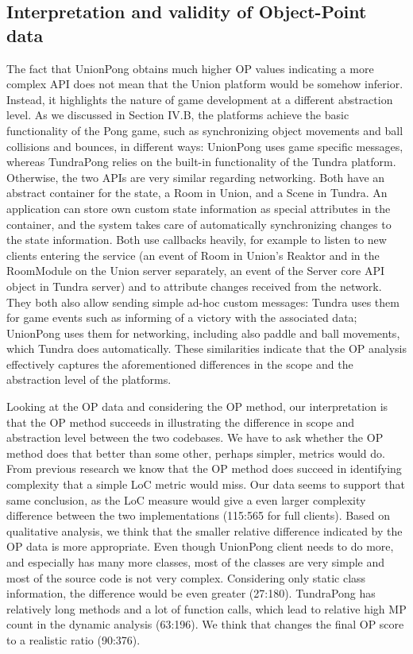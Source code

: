 \documentclass[conference]{IEEEtran}
\begin{document}
\subsection{Interpretation and validity of Object-Point data%
  \label{interpretation-and-validity-of-object-point-data}%
}

The fact that UnionPong obtains much higher OP values indicating a
more complex API does not mean that the Union platform would be
somehow inferior. Instead, it highlights the nature of game
development at a different abstraction level. As we discussed in
Section IV.B, the platforms achieve the basic functionality of the
Pong game, such as synchronizing object movements and ball collisions
and bounces, in different ways: UnionPong uses game specific messages,
whereas TundraPong relies on the built-in functionality of the Tundra
platform. Otherwise, the two APIs are very similar regarding
networking. Both have an abstract container for the state, a Room in
Union, and a Scene in Tundra. An application can store own custom
state information as special attributes in the container, and the
system takes care of automatically synchronizing changes to the state
information. Both use callbacks heavily, for example to listen to new
clients entering the service (an event of Room in Union's Reaktor and
in the RoomModule on the Union server separately, an event of the
Server core API object in Tundra server) and to attribute changes
received from the network. They both also allow sending simple ad-hoc
custom messages: Tundra uses them for game events such as informing of
a victory with the associated data; UnionPong uses them for
networking, including also paddle and ball movements, which Tundra
does automatically. These similarities indicate that the OP analysis
effectively captures the aforementioned differences in the scope and
the abstraction level of the platforms.

Looking at the OP data and considering the OP method, our
interpretation is that the OP method succeeds in illustrating the
difference in scope and abstraction level between the two
codebases. We have to ask whether the OP method does that better than
some other, perhaps simpler, metrics would do. From previous research
we know that the OP method does succeed in identifying complexity that
a simple LoC metric would miss. Our data seems to support that same
conclusion, as the LoC measure would give a even larger complexity
difference between the two implementations (115:565 for full
clients). Based on qualitative analysis, we think that the smaller
relative difference indicated by the OP data is more appropriate. Even
though UnionPong client needs to do more, and especially has many more
classes, most of the classes are very simple and most of the source
code is not very complex. Considering only static class information,
the difference would be even greater (27:180). TundraPong has
relatively long methods and a lot of function calls, which lead to
relative high MP count in the dynamic analysis (63:196). We think that
changes the final OP score to a realistic ratio (90:376).
\end{document}
